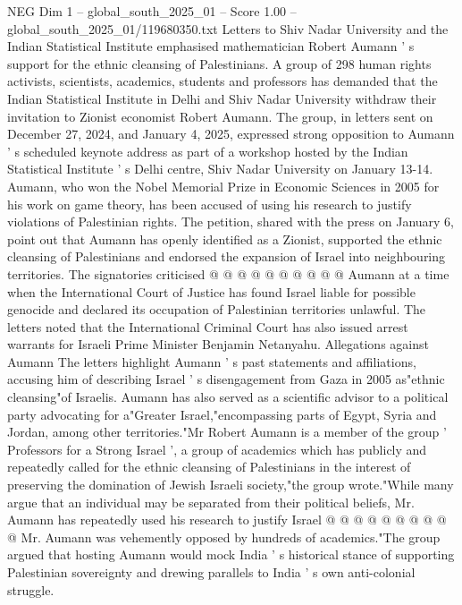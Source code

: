 \begin{textsample}{NEG Dim 1 – global\_south\_2025\_01 – Score 1.00 – global\_south\_2025\_01/119680350.txt}  \label{ex:f1_neg_150}
Letters to Shiv Nadar University and the Indian Statistical Institute emphasised mathematician Robert Aumann ' s support for the ethnic cleansing of Palestinians.
A group of 298 human rights activists, scientists, academics, students and professors has demanded that the Indian Statistical Institute in Delhi and Shiv Nadar University withdraw their invitation to Zionist economist Robert Aumann.
The group, in letters sent on December 27, 2024, and January 4, 2025, expressed strong opposition to Aumann ' s scheduled keynote address as part of a workshop hosted by the Indian Statistical Institute ' s Delhi centre, Shiv Nadar University on January 13-14.
Aumann, who won the Nobel Memorial Prize in Economic Sciences in 2005 for his work on game theory, has been accused of using his research to justify violations of Palestinian rights.
The petition, shared with the press on January 6, point out that Aumann has openly identified as a Zionist, supported the ethnic cleansing of Palestinians and endorsed the expansion of Israel into neighbouring territories.
The signatories criticised @ @ @ @ @ @ @ @ @ @ Aumann at a time when the International Court of Justice has found Israel liable for possible genocide and declared its occupation of Palestinian territories unlawful.
The letters noted that the International Criminal Court has also issued arrest warrants for Israeli Prime Minister Benjamin Netanyahu.
Allegations against Aumann The letters highlight Aumann ' s past statements and affiliations, accusing him of describing Israel ' s disengagement from Gaza in 2005 as"ethnic cleansing"of Israelis.
Aumann has also served as a scientific advisor to a political party advocating for a"Greater Israel,"encompassing parts of Egypt, Syria and Jordan, among other territories."Mr Robert Aumann is a member of the group ' Professors for a Strong Israel ', a group of academics which has publicly and repeatedly called for the ethnic cleansing of Palestinians in the interest of preserving the domination of Jewish Israeli society,"the group wrote."While many argue that an individual may be separated from their political beliefs, Mr.
Aumann has repeatedly used his research to justify Israel @ @ @ @ @ @ @ @ @ @ Mr.
Aumann was vehemently opposed by hundreds of academics."The group argued that hosting Aumann would mock India ' s historical stance of supporting Palestinian sovereignty and drewing parallels to India ' s own anti-colonial struggle.

\end{textsample}
